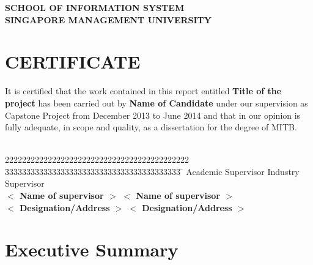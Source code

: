\documentclass[titlepage,a4paper,12pt,thmsb]{report}
\begin{document}
\begin{titlepage}
\begin{center}
\vskip 0.5cm

\large{\bf SCHOOL OF INFORMATION SYSTEM} \\
\vskip 0.5cm
\Large{\bf SINGAPORE MANAGEMENT UNIVERSITY}\\
\vskip 0.5cm
{\centering {}}
\end{center}
\pagebreak
\end{titlepage}


\chapter*{CERTIFICATE}
It is certified that the work contained in this report entitled {\bf Title of the project} has been carried out by {\bf Name of Candidate} under our supervision as Capstone Project from December 2013 to June 2014 and that in our opinion is fully adequate, in scope and quality, as a dissertation for the degree of {\sc MITB}.\\
\vspace*{0.5cm}\\

\begin{tabbing}
2222222222222222222222222222222222222222222             \= 33333333333333333333333333333333333333333 \= \kill
{\sc Academic Supervisor}                                \> {\sc Industry Supervisor} \\
{\bf $<$ Name of supervisor $>$}                         \> {\bf $<$ Name of supervisor $>$} \\
{\bf $<$ Designation/Address $>$}                    \> {\bf $<$ Designation/Address $>$} \\
\end{tabbing}


\chapter*{Executive Summary}
\end{document}
